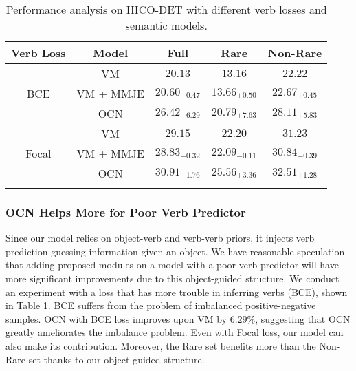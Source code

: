 \documentclass[letterpaper]{article} %
\begin{document}
\begin{table}[t]
  \small
  \setlength{\tabcolsep}{3pt}
  \centering
    \begin{tabular}{cc|ccc}
    \Xhline{1.0pt}
    {\scriptsize \textbf{Verb Loss}}  & \textbf{Model} & \textbf{Full}  & \textbf{Rare}  & {\footnotesize \textbf{Non-Rare}} \\
    \hline
    \hline
    \multirow{3}[2]{*}{BCE} & VM    & $20.13$  & $13.16$  & $22.22$  \\
          & VM + MMJE & $20.60_{+0.47}$ & $13.66_{+0.50}$ & $22.67_{+0.45}$ \\
          & OCN  & $\bm{26.42}_{+6.29}$ & $\bm{20.79}_{+7.63}$ & $\bm{28.11}_ {+5.83}$ \\
    \hline
    \multirow{3}[2]{*}{Focal} & VM    & $29.15$  & $22.20$  & $31.23$  \\
          & VM + MMJE & $28.83_{-0.32}$ & $22.09_{-0.11}$ & $30.84_{-0.39}$ \\
          & OCN  & $\bm{30.91}_{+1.76}$ & $\bm{25.56}_{+3.36}$ & $\bm{32.51}_{+1.28}$ \\
    \Xhline{1.0pt}
    \end{tabular}%
    \caption{Performance analysis on HICO-DET with different verb losses and semantic models.}
  \label{Balanced_Result_and_Joint_Embedding}%
\end{table}%


\subsubsection{OCN Helps More for Poor Verb Predictor} Since our model relies on object-verb and verb-verb priors, it injects verb prediction guessing information given an object. We have reasonable speculation that adding proposed modules on a model with a poor verb predictor will have more significant improvements due to this object-guided structure. We conduct an experiment with a loss that has more trouble in inferring verbs (BCE), shown in Table \ref{Balanced_Result_and_Joint_Embedding}. BCE suffers from the problem of imbalanced positive-negative samples. OCN with BCE loss improves upon VM by $6.29\%$, suggesting that OCN greatly ameliorates the imbalance problem. Even with Focal loss, our model can also make its contribution. Moreover, the Rare set benefits more than the Non-Rare set thanks to our object-guided structure.
\end{document}
